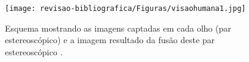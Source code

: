 
\begin{figure}[!htb]
\caption{{\footnotesize Esquema mostrando as imagens captadas em cada olho (par estereoscópico) e a imagem resultado da fusão deste par estereoscópico \cite{PERONTI2008}.}}
 
\centering %
\texttt{[image: revisao-bibliografica/Figuras/visaohumana1.jpg]}%
\label{figura:figura10}

\centering {}
{
\label{figura:figura10}
}
\end{figure}